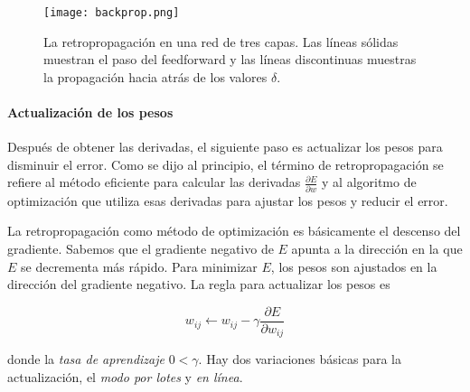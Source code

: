 



\begin{figure}
    \centering
    \texttt{[image: backprop.png]}
    \caption{La retropropagación en una red de tres capas. Las líneas sólidas muestran el paso
    del feedforward y las líneas discontinuas muestras la propagación hacia atrás de los valores $\delta$.}
    \label{fig:backprop}
\end{figure}
\paragraph{Actualización de los pesos}
Después de obtener las derivadas, el siguiente paso es actualizar los pesos
para disminuir el error. Como se dijo al principio, el término 
de retropropagación se refiere al método eficiente para calcular las 
derivadas $\frac{\partial E}{\partial w}$ y al algoritmo de optimización
que utiliza esas derivadas para ajustar los pesos y reducir el error.

La retropropagación como método de optimización es básicamente el 
descenso del gradiente. Sabemos que el gradiente negativo de $E$ apunta a la
dirección en la que $E$ se decrementa más rápido. Para minimizar $E$,
los pesos son ajustados en la dirección del gradiente negativo. La regla para
actualizar los pesos es

\[
w_{ij} \leftarrow  w_{ij} - \gamma \frac{\partial E}{\partial w_{ij}}
\]

donde la \textit{tasa de aprendizaje} $0 < \gamma$.
Hay dos variaciones básicas para la actualización, el \textit{modo por lotes} y 
\textit{en línea}.

